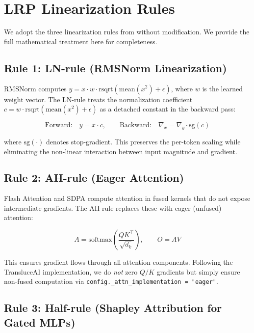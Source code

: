 \documentclass[11pt]{article}
\begin{document}
\section{LRP Linearization Rules}
\label{sec:lrp_appendix}

We adopt the three linearization rules from \citet{arora2025circuits} without modification.
We provide the full mathematical treatment here for completeness.

\subsection{Rule 1: LN-rule (RMSNorm Linearization)}

RMSNorm computes $y = x \cdot w \cdot \text{rsqrt}(\text{mean}(x^2) + \epsilon)$, where $w$ is the learned weight vector.
The LN-rule treats the normalization coefficient $c = w \cdot \text{rsqrt}(\text{mean}(x^2) + \epsilon)$ as a detached constant in the backward pass:

\begin{equation}
    \text{Forward:} \quad y = x \cdot c, \qquad
    \text{Backward:} \quad \nabla_x = \nabla_y \cdot \text{sg}(c)
\label{eq:ln_rule}
\end{equation}

where $\text{sg}(\cdot)$ denotes stop-gradient.
This preserves the per-token scaling while eliminating the non-linear interaction between input magnitude and gradient.

\subsection{Rule 2: AH-rule (Eager Attention)}

Flash Attention and SDPA compute attention in fused kernels that do not expose intermediate gradients.
The AH-rule replaces these with eager (unfused) attention:

\begin{equation}
    A = \text{softmax}\left(\frac{QK^\top}{\sqrt{d_k}}\right), \qquad O = AV
\end{equation}

This ensures gradient flows through all attention components.
Following the TransluceAI implementation, we do \emph{not} zero $Q/K$ gradients but simply ensure non-fused computation via \texttt{config.\_attn\_implementation = "eager"}.

\subsection{Rule 3: Half-rule (Shapley Attribution for Gated MLPs)}
\end{document}

